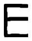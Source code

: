 \documentclass[russian,utf8,emptystyle]{eskdtext}
\begin{document}
\begin{figure}[!htb]
\includegraphics[width=\linewidth]{../data/learn/e/001}
\endminipage\hfill
{}

\end{figure}
\end{document}
